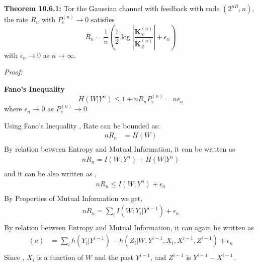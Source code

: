 %
\begin{tcolorbox}[boxrule=0pt,frame hidden,sharp corners,enhanced, opacityback=0, borderline west={2pt}{0pt}{blue}]
\textbf{Theorem 10.6.1:} Tor the Gaussian channel with feedback with code $(2^{nR}, n)$, the rate $R_n$  with $P_e^{(n)} \to 0$  satisfies
\begin{equation}
R_n = \frac{1}{n} \left( \frac{1}{2} \log \left| \frac{\mathbf{K}_Y^{(n)}}{\mathbf{K}_Z^{(n)}} \right| + \epsilon_n \right) \label{eq:10.105}
\end{equation}
with $\epsilon_n \to 0$ as $n \to \infty$.
\end{tcolorbox}
%
\textit{Proof:} 
\\
\begin{tcolorbox}[boxrule=0pt,frame hidden,sharp corners,enhanced, opacityback=0, borderline west={2pt}{0pt}{red}]
\begin{defn} \textbf{Fano's Inequality} 
\begin{equation}
H(W|Y^n) \le 1 + nR_n P_e^{(n)} = n\epsilon_n \label{eq:10.106}
\end{equation}
where $\epsilon_n \to 0$ as $P_e^{(n)} \to 0$
\end{defn}
\end{tcolorbox}
%
Using Fano's Inequality , Rate can be bounded as:
\begin{align}
nR_n &= H(W)  \\
\end{align}
By relation between Entropy and Mutual Information, it can be written as 
\begin{align}
nR_n = I(W;Y^n) + H(W|Y^n)  \\
\end{align}
and it can be also written as ,
\begin{align}
nR_n \le I(W;Y^n) + \epsilon_n  \\
\end{align}
By Properties of Mutual Information we get,
\begin{align}
nR_n = \sum_i I(W;Y_i|Y^{i-1}) + \epsilon_n  \\
\end{align}
By relation between Entropy and Mutual Information, it can again be written as 
\begin{align}
(a)&= \sum_i h(Y_i|Y^{i-1}) - h(Z_i|W,Y^{i-1},X_i,X^{i-1},Z^{i-1}) + \epsilon_n  \\
\end{align}
\newpage
 Since , $X_i$ is a function of $W$ and the past $Y^{i-1}$, and $Z^{i-1}$ is $Y^{i-1} - X^{i-1}$.
